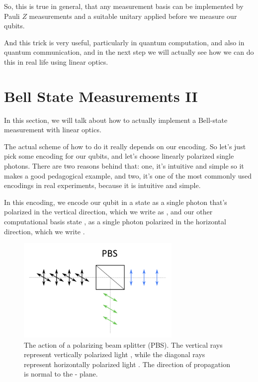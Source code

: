 So, this is true in general, that any measurement basis can be implemented by Pauli $Z$ measurements and a suitable unitary applied before we measure our qubits.

And this trick is very useful, particularly in quantum computation, and also in quantum communication, and in the next step we will actually see how we can do this in real life using linear optics.



\section{Bell State Measurements II}
\label{sec:13-3_Bell_state_measurement_2}

In this section, we will talk about how to actually implement a Bell-state measurement with linear optics.

The actual scheme of how to do it really depends on our encoding. So let's just pick some encoding for our qubits, and let's choose linearly polarized single photons. There are two reasons behind that: one, it's intuitive and simple so it makes a good pedagogical example, and two, it's one of the most commonly used encodings in real experiments, because it is intuitive and simple.

In this encoding, we encode our qubit in a state  as a single photon that's polarized in the vertical direction, which we write as , and our other computational basis state , as a single photon polarized in the horizontal direction, which we write .

\begin{figure}[t]
    \centering
    \includegraphics[width=0.7\textwidth]{lesson13/PBS.png}
    \caption[A polarizing beam splitter (PBS)]{The action of a polarizing beam splitter (PBS).  The vertical rays represent vertically polarized light , while the diagonal rays represent horizontally polarized light .  The direction of propagation is normal to the - plane. }
    \label{fig:13-PBS}
\end{figure}


